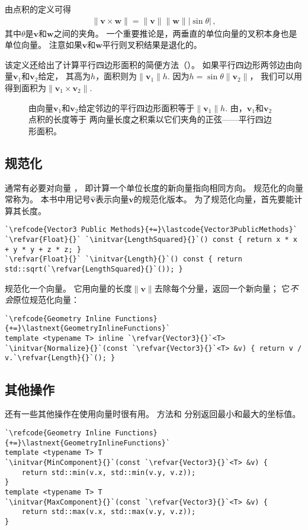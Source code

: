 由点积的定义可得
\begin{align}\label{eq:2.2}
    \|\bm v\times\bm w\|=\|\bm v\|\|\bm w\||\sin\theta|\, ,
\end{align}
其中$\theta$是$\bm v$和$\bm w$之间的夹角。
一个重要推论是，两垂直的单位向量的叉积本身也是单位向量。
注意如果$\bm v$和$\bm w$平行则叉积结果是退化的。

该定义还给出了计算平行四边形面积的简便方法（）。
如果平行四边形两邻边由向量$\bm v_1$和$\bm v_2$给定，
其高为$h$，面积则为$\|\bm v_1\|h$.
因为$h=\sin\theta\|\bm v_2\|$，
我们可以用得到面积为$\|\bm v_1\times\bm v_2\|$.
\begin{figure}[htbp]
    \centering
    \caption{由向量$\bm v_1$和$\bm v_2$给定邻边的平行四边形面积等于$\|\bm v_1\|h$.
        由\protect{}，$\bm v_1$和$\bm v_2$点积的长度等于
        两向量长度之积乘以它们夹角的正弦——平行四边形面积。}
    \label{fig:2.5}
\end{figure}

\subsection{规范化}\label{sub:规范化}
通常有必要对向量
，
即计算一个单位长度的新向量指向相同方向。
规范化的向量常称为。
本书中用记号$\hat{\bm v}$表示向量$\bm v$的规范化版本。
为了规范化向量，首先要能计算其长度。
\begin{lstlisting}
`\refcode{Vector3 Public Methods}{+=}\lastcode{Vector3PublicMethods}`
`\refvar{Float}{}` `\initvar{LengthSquared}{}`() const { return x * x + y * y + z * z; }
`\refvar{Float}{}` `\initvar{Length}{}`() const { return std::sqrt(`\refvar{LengthSquared}{}`()); }
\end{lstlisting}

规范化一个向量。
它用向量的长度$\|\bm v\|$去除每个分量，返回一个新向量；
它\emph{不会}原位规范化向量：
\begin{lstlisting}
`\refcode{Geometry Inline Functions}{+=}\lastnext{GeometryInlineFunctions}`
template <typename T> inline `\refvar{Vector3}{}`<T>
`\initvar{Normalize}{}`(const `\refvar{Vector3}{}`<T> &v) { return v / v.`\refvar{Length}{}`(); }
\end{lstlisting}

\subsection{其他操作}\label{sub:其他操作}
还有一些其他操作在使用向量时很有用。
方法和
分别返回最小和最大的坐标值。
\begin{lstlisting}
`\refcode{Geometry Inline Functions}{+=}\lastnext{GeometryInlineFunctions}`
template <typename T> T
`\initvar{MinComponent}{}`(const `\refvar{Vector3}{}`<T> &v) {
    return std::min(v.x, std::min(v.y, v.z));
}
template <typename T> T
`\initvar{MaxComponent}{}`(const `\refvar{Vector3}{}`<T> &v) {
    return std::max(v.x, std::max(v.y, v.z));
}
\end{lstlisting}

